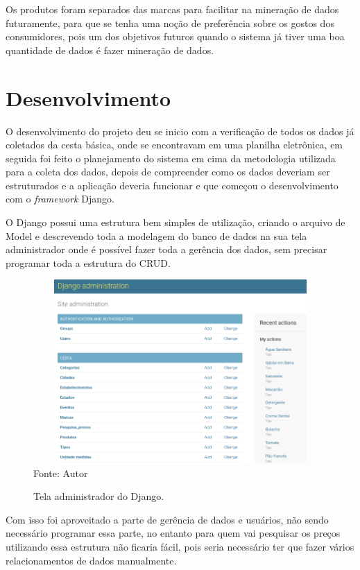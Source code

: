 \documentclass{ifto-tex}
\begin{document}
Os produtos foram separados das marcas para facilitar na mineração de dados futuramente, para que se tenha uma noção de preferência sobre os gostos dos consumidores, pois um dos objetivos futuros quando o sistema já tiver uma boa quantidade de dados é fazer mineração de dados.



	
\chapter{Desenvolvimento}
	
O desenvolvimento do projeto deu se inicio com a verificação de todos os dados já coletados da cesta básica, onde se encontravam em uma planilha eletrônica, em seguida foi feito o planejamento do sistema em cima da metodologia utilizada para a coleta dos dados, depois de compreender como os dados deveriam ser estruturados e a aplicação deveria funcionar e que começou o desenvolvimento com o \textit{framework} Django.

O Django possui uma estrutura bem simples de utilização, criando o arquivo de Model e descrevendo toda a modelagem do banco de dados na sua tela administrador onde é possível fazer toda a gerência dos dados, sem precisar programar toda a estrutura do CRUD.

\begin{figure}[H]
	\begin{center}
		\includegraphics[width=16.0cm, height= 7.0cm]{cestaadmin.png}    %
		Fonte: Autor
		\caption{Tela administrador do Django.} 
		\label{fig:faces}
	\end{center}
\end{figure}
Com isso foi aproveitado a parte de gerência de dados e usuários, não sendo necessário programar essa parte, no entanto para quem vai pesquisar os preços utilizando essa estrutura não ficaria fácil, pois seria necessário ter que fazer vários relacionamentos de dados manualmente.
\end{document}
